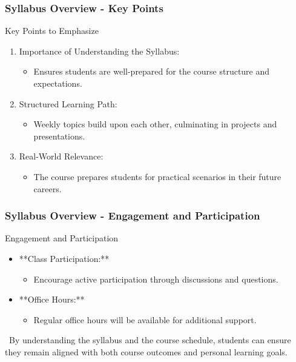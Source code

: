 \documentclass[aspectratio=169]{beamer}
\begin{document}
\begin{frame}[fragile]
    \frametitle{Syllabus Overview - Key Points}
    \begin{block}{Key Points to Emphasize}
        \begin{enumerate}
            \item Importance of Understanding the Syllabus:
                \begin{itemize}
                    \item Ensures students are well-prepared for the course structure and expectations.
                \end{itemize}
            \item Structured Learning Path:
                \begin{itemize}
                    \item Weekly topics build upon each other, culminating in projects and presentations.
                \end{itemize}
            \item Real-World Relevance:
                \begin{itemize}
                    \item The course prepares students for practical scenarios in their future careers.
                \end{itemize}
        \end{enumerate}
    \end{block}
\end{frame}

\begin{frame}[fragile]
    \frametitle{Syllabus Overview - Engagement and Participation}
    \begin{block}{Engagement and Participation}
        \begin{itemize}
            \item **Class Participation:**
                \begin{itemize}
                    \item Encourage active participation through discussions and questions.
                \end{itemize}
            \item **Office Hours:**
                \begin{itemize}
                    \item Regular office hours will be available for additional support.
                \end{itemize}
        \end{itemize}
    \end{block}
\    
    By understanding the syllabus and the course schedule, students can ensure they remain aligned with both course outcomes and personal learning goals.
\end{frame}
\end{document}
